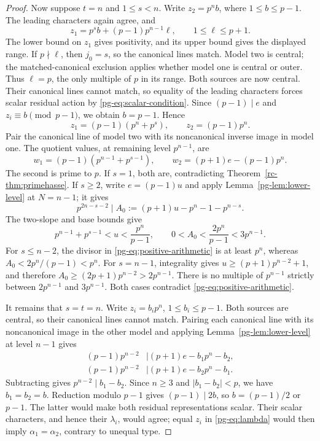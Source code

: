 \begin{proof}
Now suppose $t=n$ and $1\le s<n$. Write $z_2=p^nb$, where $1\le b\le p-1$. The leading characters again agree, and
\begin{equation}\label{pg-eq:mixed-positive}
 z_1=p^sb+(p-1)p^{n-1}\ell,\qquad1\le\ell\le p+1.
\end{equation}
The lower bound on $z_1$ gives positivity, and its upper bound gives the displayed range. If $p\nmid\ell$, then $j_0=s$, so the canonical lines match. Model two is central; the matched-canonical exclusion applies whether model one is central or outer. Thus $\ell=p$, the only multiple of $p$ in its range. Both sources are now central. Their canonical lines cannot match, so equality of the leading characters forces scalar residual action by \eqref{pg-eq:scalar-condition}. Since $(p-1)\mid e$ and $z_i\equiv b\pmod{p-1}$, we obtain $b=p-1$. Hence
\[
 z_1=(p-1)(p^n+p^s),\qquad z_2=(p-1)p^n.
\]
Pair the canonical line of model two with its noncanonical inverse image in model one. The quotient values, at remaining level $p^{n-1}$, are
\[
 w_1=(p-1)(p^{n-1}+p^{s-1}),\qquad
 w_2=(p+1)e-(p-1)p^n.
\]
The second is prime to $p$. If $s=1$, both are, contradicting Theorem~\ref{rc-thm:primehasse}. If $s\ge2$, write $e=(p-1)u$ and apply Lemma~\ref{pg-lem:lower-level} at $N=n-1$; it gives
\begin{equation}\label{pg-eq:positive-arithmetic}
 p^{2n-s-2}\mid A_0:=(p+1)u-p^n-1-p^{n-s}.
\end{equation}
The two-slope and base bounds give
\[
 p^{n-1}+p^{s-1}<u<\frac{p^n}{p-1},\qquad
 0<A_0<\frac{2p^n}{p-1}<3p^{n-1}.
\]
For $s\le n-2$, the divisor in \eqref{pg-eq:positive-arithmetic} is at least $p^n$, whereas $A_0<2p^n/(p-1)<p^n$. For $s=n-1$, integrality gives $u\ge(p+1)p^{n-2}+1$, and therefore $A_0\ge(2p+1)p^{n-2}>2p^{n-1}$. There is no multiple of $p^{n-1}$ strictly between $2p^{n-1}$ and $3p^{n-1}$. Both cases contradict \eqref{pg-eq:positive-arithmetic}.

It remains that $s=t=n$. Write $z_i=b_ip^n$, $1\le b_i\le p-1$. Both sources are central, so their canonical lines cannot match. Pairing each canonical line with its noncanonical image in the other model and applying Lemma~\ref{pg-lem:lower-level} at level $n-1$ gives
\[
 \begin{split}
 (p-1)p^{n-2}&\mid(p+1)e-b_1p^n-b_2,\\
 (p-1)p^{n-2}&\mid(p+1)e-b_2p^n-b_1.
 \end{split}
\]
Subtracting gives $p^{n-2}\mid b_1-b_2$. Since $n\ge3$ and $|b_1-b_2|<p$, we have $b_1=b_2=b$. Reduction modulo $p-1$ gives $(p-1)\mid2b$, so $b=(p-1)/2$ or $p-1$. The latter would make both residual representations scalar. Their scalar characters, and hence their $\lambda_i$, would agree; equal $z_i$ in \eqref{pg-eq:lambda} would then imply $\alpha_1=\alpha_2$, contrary to unequal type.


\end{proof}
